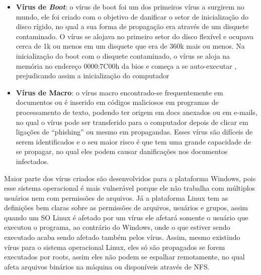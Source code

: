 \begin{itemize}
  \item \textbf{Vírus de \textit{Boot}}: o vírus de boot foi um dos primeiros vírus a surgirem no mundo,
    ele foi criado com o objetivo de danificar o setor de inicialização do disco rígido,
    no qual a sua forma de propagação era através de um disquete contaminado. O vírus se
    alojava no primeiro setor do disco flexível e ocupava cerca de 1k ou menos em um
    disquete que era de 360k mais ou menos. Na inicialização do boot com o disquete
    contaminado, o vírus se aloja na memória no endereço 0000:7C00h da bios e começa
    a se auto-executar , prejudicando assim a inicialização do computador

  \item \textbf{Vírus de Macro}: o vírus macro encontrado-se frequentemente em documentos ou é
    inserido em códigos maliciosos em programas de processamento de texto, podendo ter
    origem em docs anexados ou em e-mails, no qual o vírus pode ser transferido para o
    computador depois de clicar em ligações de “phishing” ou mesmo em propagandas. Esses
    vírus são difíceis de serem identificados e o seu maior risco é que tem uma grande
    capacidade de se propagar, no qual eles podem causar danificações nos documentos infectados.
\end{itemize}

Maior parte dos vírus criados são desenvolvidos para a plataforma Windows, pois esse sistema operacional
é mais vulnerável porque ele não trabalha com múltiplos usuários nem com permissões de arquivos. Já a plataforma
Linux tem as definições bem claras sobre as permissões de arquivos, usuários e grupos, assim quando um SO Linux é
afetado por um vírus ele afetará somente o usuário que executou o programa, ao contrário do Windows, onde o que estiver
sendo executado acaba sendo afetado também pelos vírus. Assim, mesmo existindo vírus para o sistema operacional Linux, eles
só são propagados se forem executados por roots, assim eles não podem se espalhar remotamente, no qual afeta arquivos binários
na máquina ou disponíveis através de NFS.

%



